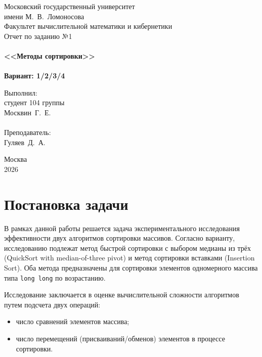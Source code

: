 \documentclass[a4paper,12pt,titlepage,finall]{article}
\begin{document}
\begin{titlepage}
    \begin{center}
        {\small \sc Московский государственный университет \\имени М.~В.~Ломоносова\\
        Факультет вычислительной математики и кибернетики\\}
        \vfill
        {\Large \sc Отчет по заданию №1}\\
        ~\\
        {\large \bf <<Методы сортировки>>}\\ 
        ~\\
        {\large \bf Вариант: 1/2/3/4}
    \end{center}
    \begin{flushright}
        \vfill {Выполнил:\\
        студент 104 группы\\
        Москвин~Г.~Е.\\
        ~\\
        Преподаватель:\\
        Гуляев~Д.~А.}
    \end{flushright}
    \begin{center}
        \vfill
        {\small Москва\\2026}
    \end{center}
\end{titlepage}

\tableofcontents
\newpage

\section{Постановка задачи}

В рамках данной работы решается задача экспериментального исследования эффективности двух алгоритмов сортировки массивов. Согласно варианту, исследованию подлежат метод быстрой сортировки с выбором медианы из трёх (QuickSort with median-of-three pivot) и метод сортировки вставками (Insertion Sort). Оба метода предназначены для сортировки элементов одномерного массива типа \texttt{long long} по возрастанию.

Исследование заключается в оценке вычислительной сложности алгоритмов путем подсчета двух операций:
\begin{itemize}
    \item число сравнений элементов массива;
    \item число перемещений (присваиваний/обменов) элементов в процессе сортировки.
\end{itemize}
\end{document}
